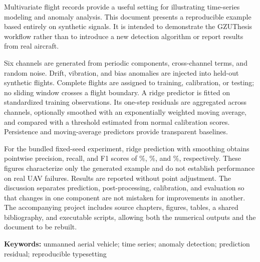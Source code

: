 Multivariate flight records provide a useful setting for illustrating time-series
modeling and anomaly analysis. This document presents a reproducible example
based entirely on synthetic signals. It is intended to demonstrate the
GZUThesis workflow rather than to introduce a new detection algorithm or
report results from real aircraft.

Six channels are generated from periodic components, cross-channel terms, and
random noise. Drift, vibration, and bias anomalies are injected into held-out
synthetic flights. Complete flights are assigned to training, calibration, or
testing; no sliding window crosses a flight boundary. A ridge predictor is
fitted on standardized training observations. Its one-step residuals are
aggregated across channels, optionally smoothed with an exponentially weighted
moving average, and compared with a threshold estimated from normal calibration
scores. Persistence and moving-average predictors provide transparent baselines.

For the bundled fixed-seed experiment, ridge prediction with smoothing obtains
pointwise precision, recall, and F1 scores of \DemoPrecision\%, \DemoRecall\%,
and \DemoFone\%, respectively. These figures characterize only the generated
example and do not establish performance on real UAV failures. Results are
reported without point adjustment. The discussion separates prediction,
post-processing, calibration, and evaluation so that changes in one component
are not mistaken for improvements in another. The accompanying project includes
source chapters, figures, tables, a shared bibliography, and executable scripts,
allowing both the numerical outputs and the document to be rebuilt.

\par\vspace{1em}
\noindent\textbf{Keywords:} unmanned aerial vehicle; time series; anomaly detection;
prediction residual; reproducible typesetting
